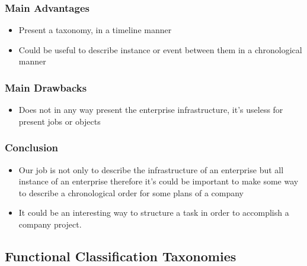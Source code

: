 \documentclass[12pt]{report}
\begin{document}
\subsubsection*{Main Advantages }
\begin{itemize}
	\item Present a taxonomy, in a timeline manner \par

	\item Could be useful to describe instance or event between them in a chronological manner\par


\end{itemize}\subsubsection*{Main Drawbacks }
\begin{itemize}
	\item Does not in any way present the enterprise infrastructure, it’s useless for present jobs or objects  \par

\end{itemize}\subsubsection*{ Conclusion }
\begin{itemize}
	\item Our job is not only to describe the infrastructure of an enterprise but all instance of an enterprise therefore it’s could be important to make some way to describe a chronological order for some plans of a company \par

	\item It could be an interesting way to structure a task in order to accomplish a company project.\par



\newpage

\vspace{\baselineskip}
\end{itemize}\subsection*{ Functional Classification Taxonomies }
\end{document}
